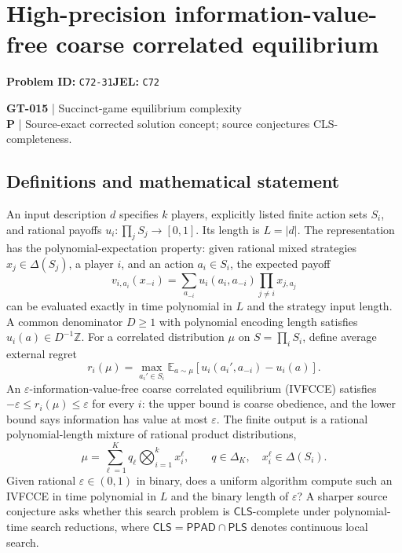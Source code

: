 \documentclass[11pt,a4paper]{article}
\begin{document}
\section*{High-precision information-value-free coarse correlated equilibrium}
\textbf{Problem ID:} \texttt{C72-31}\quad \textbf{JEL:} \texttt{C72}\par
\label{problem:OP-0145}
\label{game:GT-015}
{\sffamily\small\color{muted}
\textbf{GT-015} | Succinct-game equilibrium complexity\\
\textbf{P} | Source-exact corrected solution concept; source conjectures CLS-completeness.
\par}
\subsection*{Definitions and mathematical statement}
An input description $d$ specifies $k$ players, explicitly listed finite action sets $S_i$, and rational payoffs $u_i:\prod_jS_j\to[0,1]$. Its length is $L=|d|$. The representation has the polynomial-expectation property: given rational mixed strategies $x_j\in\Delta(S_j)$, a player $i$, and an action $a_i\in S_i$, the expected payoff
\[
 v_{i,a_i}(x_{-i})=\sum_{a_{-i}}u_i(a_i,a_{-i})\prod_{j\ne i}x_{j,a_j}
\]
can be evaluated exactly in time polynomial in $L$ and the strategy input length. A common denominator $D\geq1$ with polynomial encoding length satisfies $u_i(a)\in D^{-1}\mathbb Z$. For a correlated distribution $\mu$ on $S=\prod_iS_i$, define average external regret
\[
 r_i(\mu)=\max_{a_i'\in S_i}\mathbb E_{a\sim\mu}
 [u_i(a_i',a_{-i})-u_i(a)].
\]
An $\varepsilon$-information-value-free coarse correlated equilibrium (IVFCCE) satisfies $-\varepsilon\leq r_i(\mu)\leq\varepsilon$ for every $i$: the upper bound is coarse obedience, and the lower bound says information has value at most $\varepsilon$. The finite output is a rational polynomial-length mixture of rational product distributions,
\[
 \mu=\sum_{\ell=1}^Kq_\ell\bigotimes_{i=1}^kx_i^\ell,
 \qquad q\in\Delta_K,\quad x_i^\ell\in\Delta(S_i).
\]
Given rational $\varepsilon\in(0,1)$ in binary, does a uniform algorithm compute such an IVFCCE in time polynomial in $L$ and the binary length of $\varepsilon$? A sharper source conjecture asks whether this search problem is $\mathsf{CLS}$-complete under polynomial-time search reductions, where $\mathsf{CLS}=\mathsf{PPAD}\cap\mathsf{PLS}$ denotes continuous local search.
\end{document}
